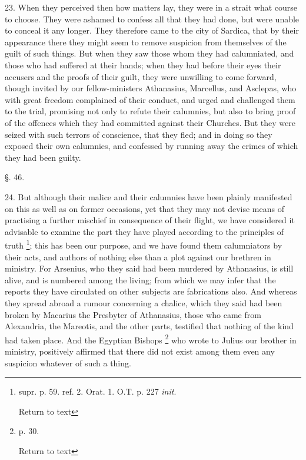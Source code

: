 23. When they perceived then how matters lay,
they were in a strait what course to choose. They were ashamed to
confess all that they had done, but were unable to conceal it any
longer. They therefore came to the city of Sardica, that by their
appearance there they might seem to remove suspicion from themselves
of the guilt of such things. But when they saw those whom they had
calumniated, and those who had suffered at their hands; when they had
before their eyes their accusers and the proofs of their guilt, they
were unwilling to come forward, though invited by our fellow-ministers
Athanasius, Marcellus, and Asclepas, who with great freedom complained
of their conduct, and urged and challenged them to the trial,
promising not only to refute their calumnies, but also to bring proof
of the offences which they had committed against their Churches. But
they were seized with such terrors of conscience, that they fled; and
in doing so they exposed their own calumnies, and confessed by running
away the crimes of which they had been guilty.

§. 46.

24. But although their malice and their calumnies
have been plainly manifested on this as well as on former occasions,
yet that they may not devise means of practising a further mischief in
consequence of their flight, we have considered it advisable to
examine the part they have played according to the principles of truth
\footnote{supr. p. 59. ref. 2. Orat. 1. O.T. p. 227 \emph{init}.

Return to text}; this has been our purpose, and we have found them
calumniators by their acts, and authors of nothing else than a plot
against our brethren in ministry. For Arsenius, who they said had been
murdered by Athanasius, is still alive, and is numbered among the
living; from which we may infer that the reports they have circulated
on other subjects are fabrications also. And whereas they spread
abroad a rumour concerning a chalice, which they said had been broken
by Macarius the Presbyter of Athanasius, those who came from
Alexandria, the Mareotis, and the other parts, testified that nothing
of the kind had taken place. And the Egyptian Bishops \footnote{p. 30.

Return to text} who
wrote to Julius our brother in ministry, positively affirmed that
there did not exist among them even any suspicion whatever of
such a thing.


